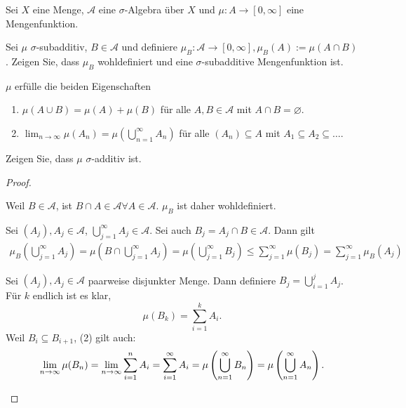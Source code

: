 \begin{Problem}
	Sei $X$ eine Menge, $\mathcal A$ eine $\sigma$-Algebra über $X$ und $\mu : A \to [0, \infty]$ eine Mengenfunktion.
	\begin{parts}
	\item  Sei $\mu$ $\sigma$-subadditiv, $B \in \mathcal A$ und definiere $\mu_B : \mathcal A \to [0,\infty ], \mu_B (A) := \mu(A \cap B)$. Zeigen Sie, dass $\mu_B$ wohldefiniert und eine $\sigma$-subadditive Mengenfunktion ist.
	\item $\mu$ erf\"{u}lle die beiden Eigenschaften
		\begin{enumerate}[label=(\arabic*)]
			\item $\mu(A\cup B)=\mu(A)+\mu(B)$ f\"{u}r alle $A,B\in \mathcal A$ mit $A\cap B=\varnothing$.
			\item $\lim_{n \to \infty} \mu\left( A_n \right) =\mu\left( \bigcup_{n=1} ^\infty A_n \right) $ f\"{u}r alle $(A_n)\subseteq A$ mit $A_1\subseteq A_2\subseteq \dots$.
		\end{enumerate}
		Zeigen Sie, dass $\mu$ $\sigma$-additiv ist.
	\end{parts}
\end{Problem}
\begin{proof}
	\begin{parts}
	\item Weil $B\in\mathcal A$, ist $B\cap A\in\mathcal A \forall A\in\mathcal A$. $\mu_B$ ist daher wohldefiniert. 

	Sei $(A_j), A_j\in\mathcal A$, $\bigcup_{j=1}^\infty A_j\in\mathcal A$. Sei auch $B_j=A_j\cap B\in \mathcal A$. Dann gilt
	\begin{gather*}
		\mu_B\left( \bigcup_{j=1} ^\infty A_j \right) =\mu\left( B\cap \bigcup_{j=1} ^\infty A_j \right)=\mu\left( \bigcup_{j=1} ^\infty B_j \right) \le \sum_{j=1}^\infty \mu(B_j)=\sum_{j=1}^\infty \mu_B(A_j) 
	\end{gather*}
	\item Sei $(A_j), A_j\in\mathcal A$ paarweise disjunkter Menge. Dann definiere $B_j=\bigcup_{i=1}^j A_j$. F\"{u}r $k$ endlich ist es klar,
		\[
			\mu(B_k)=\sum_{i=1}^k A_i
		.\]
		Weil $B_i\subseteq B_{i+1}$, (2) gilt auch:
		\[
			\lim_{n \to \infty} \mu(B_n)=\lim_{n \to \infty} \sum_{i=1}^n A_i=\sum_{i=1}^\infty A_i=\mu\left( \bigcup_{n=1} ^\infty B_n \right) =\mu\left( \bigcup_{n=1} ^\infty A_n \right) 
		.\qedhere\] 
	\end{parts}
\end{proof}
